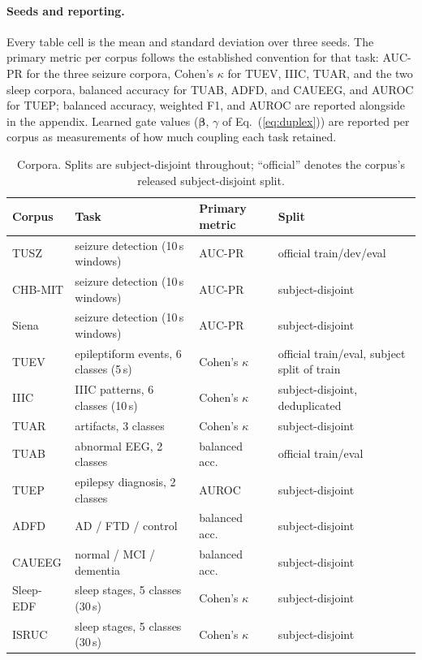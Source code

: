\paragraph{Seeds and reporting.}
Every table cell is the mean and standard deviation over three seeds. The
primary metric per corpus follows the established convention for that
task: AUC-PR for the three seizure corpora, Cohen's $\kappa$ for TUEV, IIIC,
TUAR, and the two sleep corpora, balanced accuracy for TUAB, ADFD, and
CAUEEG, and AUROC for TUEP; balanced accuracy, weighted F1, and AUROC are
reported alongside in the appendix. Learned gate values
($\boldsymbol{\beta}$, $\gamma$ of Eq.~(\ref{eq:duplex})) are reported per
corpus as measurements of how much coupling each task retained.

\begin{table}[t]
\centering
\small
\caption{Corpora. Splits are subject-disjoint throughout; ``official''
denotes the corpus's released subject-disjoint split.}
\label{tab:corpora}
\begin{tabular}{llll}
\toprule
Corpus & Task & Primary metric & Split \\
\midrule
TUSZ & seizure detection (10\,s windows) & AUC-PR & official train/dev/eval \\
CHB-MIT & seizure detection (10\,s windows) & AUC-PR & subject-disjoint \\
Siena & seizure detection (10\,s windows) & AUC-PR & subject-disjoint \\
TUEV & epileptiform events, 6 classes (5\,s) & Cohen's $\kappa$ & official train/eval, subject split of train \\
IIIC & IIIC patterns, 6 classes (10\,s) & Cohen's $\kappa$ & subject-disjoint, deduplicated \\
TUAR & artifacts, 3 classes & Cohen's $\kappa$ & subject-disjoint \\
TUAB & abnormal EEG, 2 classes & balanced acc.\ & official train/eval \\
TUEP & epilepsy diagnosis, 2 classes & AUROC & subject-disjoint \\
ADFD & AD / FTD / control & balanced acc.\ & subject-disjoint \\
CAUEEG & normal / MCI / dementia & balanced acc.\ & subject-disjoint \\
Sleep-EDF & sleep stages, 5 classes (30\,s) & Cohen's $\kappa$ & subject-disjoint \\
ISRUC & sleep stages, 5 classes (30\,s) & Cohen's $\kappa$ & subject-disjoint \\
\bottomrule
\end{tabular}
\end{table}

